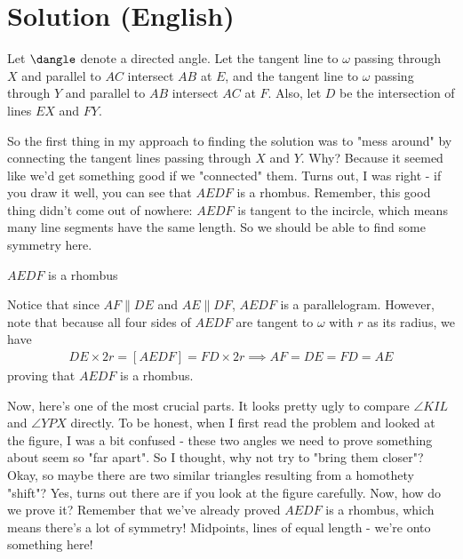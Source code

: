 \section{Solution (English)}

Let $\dangle$ denote a directed angle.
Let the tangent line to $\omega$ passing through $X$ and parallel to $AC$ intersect $AB$ at $E$, and the tangent line to $\omega$ passing through $Y$ and parallel to $AB$ intersect $AC$ at $F$. Also, let $D$ be the intersection of lines $EX$ and $FY$.
\begin{comment*}
    So the first thing in my approach to finding the solution was to "mess around" by connecting the tangent lines passing through $X$ and $Y$. Why? Because it seemed like we'd get something good if we "connected" them. Turns out, I was right - if you draw it well, you can see that $AEDF$ is a rhombus. Remember, this good thing didn't come out of nowhere: $AEDF$ is tangent to the incircle, which means many line segments have the same length. So we should be able to find some symmetry here.
\end{comment*}
\begin{lemmarev}
    $AEDF$ is a rhombus
    \begin{buktilemma}
        Notice that since $AF \parallel DE$ and $AE \parallel DF$, $AEDF$ is a parallelogram. However, note that because all four sides of $AEDF$ are tangent to $\omega$ with $r$ as its radius, we have
        \begin{align*}
            DE \times 2r = [AEDF] = FD \times 2r \implies AF =DE = FD = AE 
        \end{align*}
        proving that $AEDF$ is a rhombus.
    \end{buktilemma}
\end{lemmarev}
\begin{comment*}
    Now, here's one of the most crucial parts. It looks pretty ugly to compare $\angle KIL$ and $\angle YPX$ directly. To be honest, when I first read the problem and looked at the figure, I was a bit confused - these two angles we need to prove something about seem so "far apart". So I thought, why not try to "bring them closer"? Okay, so maybe there are two similar triangles resulting from a homothety "shift"? Yes, turns out there are if you look at the figure carefully. Now, how do we prove it? Remember that we've already proved $AEDF$ is a rhombus, which means there's a lot of symmetry! Midpoints, lines of equal length - we're onto something here!
\end{comment*}
